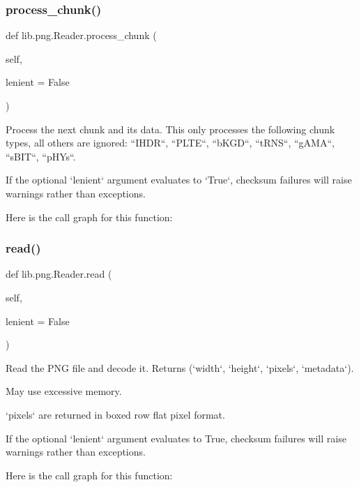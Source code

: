 \subsubsection{\texorpdfstring{process\+\_\+chunk()}{process\_chunk()}}
{\footnotesize\ttfamily def lib.\+png.\+Reader.\+process\+\_\+chunk (\begin{DoxyParamCaption}\item[{}]{self,  }\item[{}]{lenient = {\ttfamily False} }\end{DoxyParamCaption})}

\begin{DoxyVerb}Process the next chunk and its data.  This only processes the
following chunk types, all others are ignored: ``IHDR``,
``PLTE``, ``bKGD``, ``tRNS``, ``gAMA``, ``sBIT``, ``pHYs``.

If the optional `lenient` argument evaluates to `True`,
checksum failures will raise warnings rather than exceptions.
\end{DoxyVerb}
 Here is the call graph for this function\+:
\mbox{\label{classlib_1_1png_1_1_reader_abee96e12fc05a9024ebf916b1b90ac44}} 
\subsubsection{\texorpdfstring{read()}{read()}}
{\footnotesize\ttfamily def lib.\+png.\+Reader.\+read (\begin{DoxyParamCaption}\item[{}]{self,  }\item[{}]{lenient = {\ttfamily False} }\end{DoxyParamCaption})}

\begin{DoxyVerb}Read the PNG file and decode it.  Returns (`width`, `height`,
`pixels`, `metadata`).

May use excessive memory.

`pixels` are returned in boxed row flat pixel format.

If the optional `lenient` argument evaluates to True,
checksum failures will raise warnings rather than exceptions.
\end{DoxyVerb}
 Here is the call graph for this function\+:
\mbox{\label{classlib_1_1png_1_1_reader_a90cb36f6dfd5c54e426b56eddc28415d}} 
